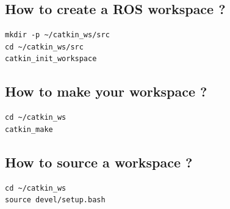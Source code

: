 \subsection{How to create a ROS workspace ?} 
\begin{lstlisting}
mkdir -p ~/catkin_ws/src
cd ~/catkin_ws/src
catkin_init_workspace
\end{lstlisting}
\subsection{How to make your workspace ?}
\begin{lstlisting}
cd ~/catkin_ws
catkin_make
\end{lstlisting}
\subsection{How to source a workspace ?}
\begin{lstlisting}
cd ~/catkin_ws
source devel/setup.bash
\end{lstlisting}